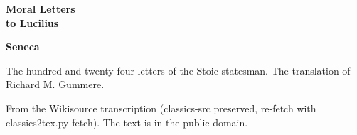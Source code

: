\documentclass[11pt,letterpaper]{article}
\begin{document}
\color{ink}

\begin{titlepage}
\centering
\vspace*{4em}
{\LARGE\bfseries\color{heading} Moral Letters\\[0.3em]to Lucilius\par}
\vspace{2em}
{\Large\bfseries\color{heading} Seneca\par}
\vspace{2.5em}
{\itshape\color{subhead}\parbox{0.8\linewidth}{\centering The hundred and twenty-four letters of the Stoic statesman. The translation of Richard M. Gummere.\par}}
\vfill
{\small From the Wikisource transcription (classics-src preserved, re-fetch with classics2tex.py fetch). The text is in the public domain.\par}
\vspace{2em}
\end{titlepage}

\tableofcontents


\end{document}
